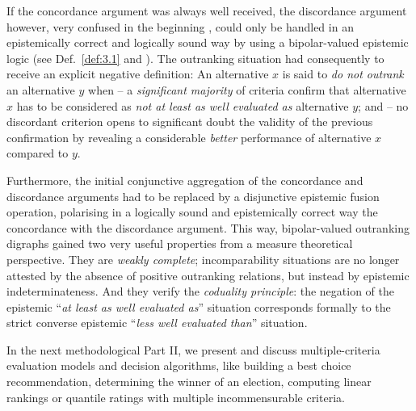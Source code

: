 If the concordance argument was always well received, the discordance argument however, very confused in the beginning \citep{ROY-1966}, could only be handled in an epistemically correct and logically sound way by using a bipolar-valued epistemic logic (see Def.~\vref{def:3.1} and \citealp{BIS-2013}). The outranking situation had consequently to receive an explicit negative definition: An alternative $x$ is said to \emph{do not outrank} an alternative $y$ when – a \emph{significant majority} of criteria confirm that alternative $x$ has to be considered as \emph{not at least as well evaluated as} alternative $y$; and – no discordant criterion opens to significant doubt the validity of the previous confirmation by revealing a considerable \emph{better} performance of alternative $x$ compared to $y$.

Furthermore, the initial conjunctive aggregation of the concordance and discordance arguments had to be replaced by a disjunctive epistemic fusion operation, polarising in a logically sound and epistemically correct way the concordance with the discordance argument. This way, bipolar-valued outranking  digraphs gained two very useful properties from a measure theoretical perspective. They are \emph{weakly complete}; incomparability situations are no longer attested by the absence of positive outranking relations, but instead by epistemic indeterminateness. And they verify the \emph{coduality principle}: the negation of the epistemic ``\emph{at least as well evaluated as}'' situation corresponds formally to the strict converse epistemic ``\emph{less well evaluated than}'' situation.

\vspace{\baselineskip}
In the next methodological Part II, we present and discuss multiple-criteria evaluation models and decision algorithms, like building a best choice recommendation, determining the winner of an election, computing linear rankings or quantile ratings with multiple incommensurable criteria.


%
%
